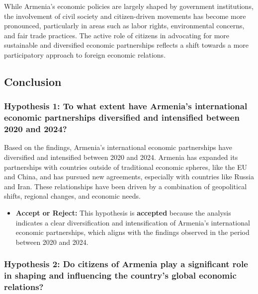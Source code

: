 \documentclass[
]{article}
\providecommand{\tightlist}{%
  \setlength{\itemsep}{0pt}\setlength{\parskip}{0pt}}
\begin{document}
While Armenia's economic policies are largely shaped by government
institutions, the involvement of civil society and citizen-driven
movements has become more pronounced, particularly in areas such as
labor rights, environmental concerns, and fair trade practices. The
active role of citizens in advocating for more sustainable and
diversified economic partnerships reflects a shift towards a more
participatory approach to foreign economic relations.

\subsection{Conclusion}\label{conclusion}

\subsubsection{Hypothesis 1: To what extent have Armenia's international
economic partnerships diversified and intensified between 2020 and
2024?}\label{hypothesis-1-to-what-extent-have-armenias-international-economic-partnerships-diversified-and-intensified-between-2020-and-2024}

Based on the findings, Armenia's international economic partnerships
have diversified and intensified between 2020 and 2024. Armenia has
expanded its partnerships with countries outside of traditional economic
spheres, like the EU and China, and has pursued new agreements,
especially with countries like Russia and Iran. These relationships have
been driven by a combination of geopolitical shifts, regional changes,
and economic needs.

\begin{itemize}
\tightlist
\item
  \textbf{Accept or Reject:} This hypothesis is \textbf{accepted}
  because the analysis indicates a clear diversification and
  intensification of Armenia's international economic partnerships,
  which aligns with the findings observed in the period between 2020 and
  2024.
\end{itemize}

\subsubsection{Hypothesis 2: Do citizens of Armenia play a significant
role in shaping and influencing the country's global economic
relations?}\label{hypothesis-2-do-citizens-of-armenia-play-a-significant-role-in-shaping-and-influencing-the-countrys-global-economic-relations}
\end{document}
